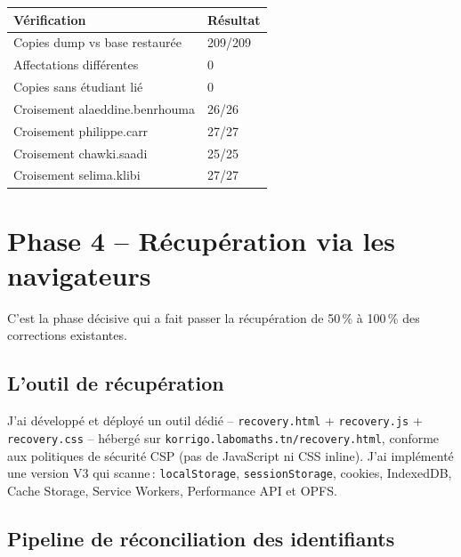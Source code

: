 \documentclass[11pt,a4paper]{article}
\newcommand{\ok}{\textcolor{vertOK}{\textbf{\checkmark}}}
\begin{document}
\begin{center}
	\renewcommand{\arraystretch}{1.35}
	\begin{tabularx}{\linewidth}{XC{3.5cm}|}
		\toprule
		\textbf{\sffamily V\'{e}rification} & \textbf{\sffamily R\'{e}sultat} \\
		\midrule
		Copies dump vs base restaur\'{e}e   & 209/209 \ok{}                   \\
		\midrule
		Affectations diff\'{e}rentes        & 0 \ok{}                         \\
		\midrule
		Copies sans \'{e}tudiant li\'{e}    & 0 \ok{}                         \\
		\midrule
		Croisement alaeddine.benrhouma      & 26/26 \ok{}                     \\
		\midrule
		Croisement philippe.carr            & 27/27 \ok{}                     \\
		\midrule
		Croisement chawki.saadi             & 25/25 \ok{}                     \\
		\midrule
		Croisement selima.klibi             & 27/27 \ok{}                     \\
		\bottomrule
	\end{tabularx}
\end{center}

\section{Phase 4 -- R\'{e}cup\'{e}ration via les navigateurs}

C'est la phase d\'{e}cisive qui a fait passer la r\'{e}cup\'{e}ration de 50\,\% \`{a} 100\,\% des corrections existantes.

\subsection{L'outil de r\'{e}cup\'{e}ration}

J'ai d\'{e}velopp\'{e} et d\'{e}ploy\'{e} un outil d\'{e}di\'{e} -- \texttt{recovery.html} + \texttt{recovery.js} + \texttt{recovery.css} -- h\'{e}berg\'{e} sur \texttt{korrigo.labomaths.tn/recovery.html}, conforme aux politiques de s\'{e}curit\'{e} CSP (pas de JavaScript ni CSS inline). J'ai impl\'{e}ment\'{e} une version V3 qui scanne\,: \texttt{localStorage}, \texttt{sessionStorage}, cookies, IndexedDB, Cache Storage, Service Workers, Performance API et OPFS.

\subsection{Pipeline de r\'{e}conciliation des identifiants}
\end{document}
